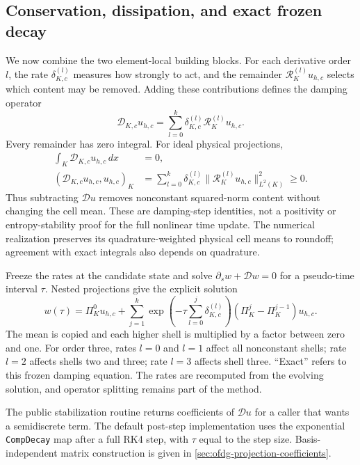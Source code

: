 \subsection{Conservation, dissipation, and exact frozen decay}
\label{sec:ofdg-decay}
We now combine the two element-local building blocks. For each derivative
order $l$, the rate $\delta_{K,c}^{(l)}$ measures how strongly to act, and
the remainder $\mathcal R_K^{(l)}u_{h,c}$ selects which content may be
removed. Adding these contributions defines the damping operator
\begin{equation}
 \mathcal D_{K,c}u_{h,c}=\sum_{l=0}^k\delta_{K,c}^{(l)}
          \mathcal R_K^{(l)}u_{h,c}.
 \label{eq:ofdg-damping-operator}
\end{equation}
Every remainder has zero integral. For ideal physical projections,
\begin{align}
 \int_K\mathcal D_{K,c}u_{h,c}\,dx&=0,
 \label{eq:ofdg-local-conservation}\\
 (\mathcal D_{K,c}u_{h,c},u_{h,c})_K
 &=\sum_{l=0}^k\delta_{K,c}^{(l)}
       \|\mathcal R_K^{(l)}u_{h,c}\|_{L^2(K)}^2\geq0.
 \label{eq:ofdg-dissipation}
\end{align}
Thus subtracting $\mathcal D u$ removes nonconstant squared-norm content
without changing the cell mean. These are damping-step identities, not a
positivity or entropy-stability proof for the full nonlinear time update.
The numerical realization preserves its quadrature-weighted physical cell
means to roundoff; agreement with exact integrals also depends on quadrature.

Freeze the rates at the candidate state and solve
$\partial_s w+\mathcal D w=0$ for a pseudo-time interval $\tau$. Nested
projections give the explicit solution
\begin{equation}
 w(\tau)=\Pi_K^0u_{h,c}+\sum_{j=1}^k
  \exp\!\left(-\tau\sum_{l=0}^j\delta_{K,c}^{(l)}\right)
  (\Pi_K^j-\Pi_K^{j-1})u_{h,c}.
 \label{eq:ofdg-exact-decay}
\end{equation}
The mean is copied and each higher shell is multiplied by a factor between
zero and one. For order three, rates $l=0$ and $l=1$ affect all nonconstant
shells; rate $l=2$ affects shells two and three; rate $l=3$ affects shell three.
``Exact'' refers to this frozen damping equation. The rates are recomputed
from the evolving solution, and operator splitting remains part of the method.

The public stabilization routine returns coefficients of $\mathcal D u$ for
a caller that wants a semidiscrete term. The default post-step implementation uses the exponential
\texttt{CompDecay} map after a full RK4 step, with $\tau$ equal to the step
size. Basis-independent matrix construction is given in
\cref{sec:ofdg-projection-coefficients}.

